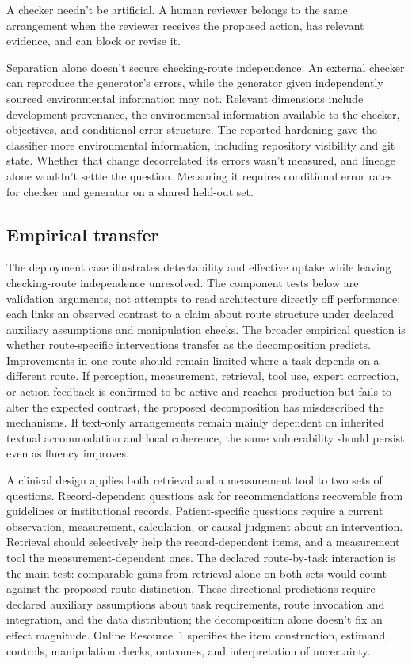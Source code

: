 \documentclass[12pt]{article}
\begin{document}
A checker needn't be artificial. A human reviewer belongs to the same arrangement when the
reviewer receives the proposed action, has relevant evidence, and can block or revise it.

Separation alone doesn't secure checking-route independence. An external checker can
reproduce the generator's errors, while the generator given independently sourced
environmental information may not. Relevant dimensions include development provenance,
the environmental information available to the checker, objectives, and conditional error
structure. The reported hardening gave the classifier more environmental information,
including repository visibility and git state. Whether that change decorrelated its errors
wasn't measured, and lineage alone wouldn't settle the question. Measuring it requires
conditional error rates for checker and generator on a shared held-out set.

\subsection{Empirical transfer}\label{ssec:transfer}

The deployment case illustrates detectability and effective uptake while leaving
checking-route independence unresolved. The component tests below are validation arguments,
not attempts to read architecture directly off performance: each links an observed contrast
to a claim about route structure under declared auxiliary assumptions and manipulation
checks. The broader empirical question is whether route-specific interventions transfer as
the decomposition predicts. Improvements in one route should remain limited where a task
depends on a different route. If perception,
measurement, retrieval, tool use, expert correction, or action feedback is confirmed to be
active and reaches production but fails to alter the expected contrast, the proposed
decomposition has misdescribed the mechanisms. If text-only arrangements remain mainly
dependent on inherited textual accommodation and local coherence, the same vulnerability
should persist even as fluency improves.

A clinical design applies both retrieval and a measurement tool to two sets of questions.
Record-dependent questions ask for recommendations recoverable from guidelines or
institutional records. Patient-specific questions require a current observation,
measurement, calculation, or causal judgment about an intervention.
Retrieval should selectively help the record-dependent items, and a measurement tool the
measurement-dependent ones. The declared route-by-task interaction is the main test:
comparable gains from retrieval alone on both sets would count against the proposed route
distinction. These directional predictions require declared auxiliary assumptions about
task requirements, route invocation and integration, and the data distribution; the
decomposition alone doesn't fix an effect magnitude. Online Resource~1 specifies the item
construction, estimand, controls, manipulation checks, outcomes, and interpretation of
uncertainty.
\end{document}
